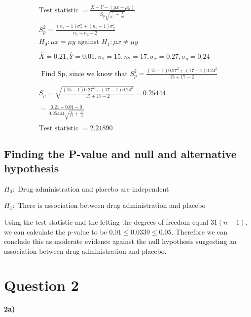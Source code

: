\documentclass[oneside, a4paper]{article}
\begin{document}
\begin{equation*}
    \begin{split}
        \text{Test statistic } = \frac{\overline{X} - \overline{Y}-(\mu x - \mu y)}{S_p\sqrt{\frac{1}{n_1} + \frac{1}{n_2}}} \\
        S_p^2 = \frac{(n_1-1) \sigma_x^2 + (n_2-1) \sigma_y^2}{n_1+n_2-2} \\
        H_0 : \mu x = \mu y \text{ against } H_1 : \mu x \neq \mu y \\ \\
        \overline{X} = 0.21, \overline{Y} = 0.01, n_1 = 15, n_2 = 17, \sigma_x = 0.27, \sigma_y = 0.24 \\\\
        \text{ Find Sp, since we know that } 
        S_p^2 = \frac{(15-1)0.27^2 + (17-1)0.24^2}{15+17-2} \\ \\ 
        S_p = \sqrt{\frac{(15-1)0.27^2 + (17-1)0.24^2}{15+17-2}} = 0.25444\\ \\
        = \frac{0.21 - 0.01 - 0}{0.25444\sqrt{\frac{1}{15} + \frac{1}{17}}} \\\\
        \text{Test statistic } = 2.21890
    \end{split}
\end{equation*}

\subsection{Finding the P-value and null and alternative hypothesis}

$H_0:$ Drug administration and placebo are independent

$H_1:$ There is association between drug administration and placebo

Using the test statistic and the letting the degrees of freedom equal $31 (n-1)$, we can calculate the p-value to be $0.01 \leq 0.0339 \leq 0.05$. Therefore we can conclude this as moderate evidence against the null hypothesis suggesting an association between drug administration and placebo.


\newpage

\section{Question 2}
\textbf{2a)}
\end{document}
